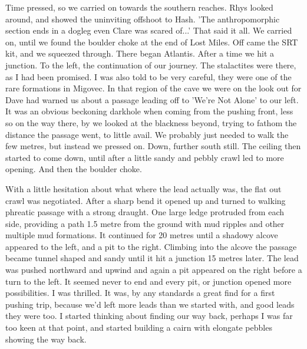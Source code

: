 \documentclass[onecolumn]{book}
\begin{document}
Time pressed, so we carried on towards the southern reaches. Rhys looked around, and showed the uninviting offshoot to Hash. 'The anthropomorphic section ends in a dogleg even Clare was scared of...' That said it all. We carried on, until we found the boulder choke at the end of Lost Miles. Off came the SRT kit, and we squeezed through. There began Atlantis. After a time we hit a junction. To the left, the continuation of our journey. The stalactites were there, as I had been promised. I was also told to be very careful, they were one of the rare formations in Migovec. In that region of the cave we were on the look out  for Dave had warned us about a passage leading off to 'We're Not Alone' to our left. It was an obvious beckoning darkhole when coming from the pushing front, less so on the way there, by we looked at the blackness beyond, trying to fathom the distance the passage went, to little avail. We probably just needed to walk the few metres, but instead we pressed on. Down, further south still. The ceiling then started to come down, until after a little sandy and pebbly crawl led to more opening. And then the boulder choke.

With a little hesitation about what where the lead actually was, the flat out crawl was negotiated. After a sharp bend it opened up and turned to walking phreatic passage with a strong draught. One large ledge protruded from each side, providing a path 1.5 metre from the ground with mud ripples and other multiple mud formations. It continued for 20 metres until a shadowy alcove appeared to the left, and a pit to the right. Climbing into the alcove the passage became tunnel shaped and sandy until it hit a junction 15 metres later. The lead was pushed northward and upwind and again a pit appeared on the right before a turn to the left. It seemed never to end and every pit, or junction opened more possibilities. I was thrilled. It was, by any standards a great find for a first pushing trip, because we'd left more leads than we started with, and good leads they were too. I started thinking about finding our way back, perhaps I was far too keen at that point, and started building a cairn with elongate pebbles showing the way back.
\end{document}
